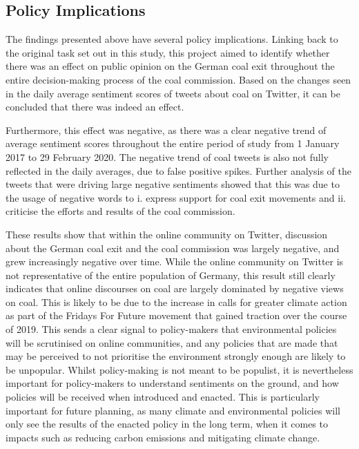\documentclass[12pt,onecolumn,twoside]{layout}
\begin{document}
\subsection*{Policy Implications} 
The findings presented above have several policy implications. Linking back to the original task set out in this study, this project aimed to identify whether there was an effect on public opinion on the German coal exit throughout the entire decision-making process of the coal commission. Based on the changes seen in the daily average sentiment scores of tweets about coal on Twitter, it can be concluded that there was indeed an effect. 

Furthermore, this effect was negative, as there was a clear negative trend of average sentiment scores throughout the entire period of study from 1 January 2017 to 29 February 2020. The negative trend of coal tweets is also not fully reflected in the daily averages, due to false positive spikes. Further analysis of the tweets that were driving large negative sentiments showed that this was due to the usage of negative words to i. express support for coal exit movements and ii. criticise the efforts and results of the coal commission. 

These results show that within the online community on Twitter, discussion about the German coal exit and the coal commission was largely negative, and grew increasingly negative over time. While the online community on Twitter is not representative of the entire population of Germany, this result still clearly indicates that online discourses on coal are largely dominated by negative views on coal. This is likely to be due to the increase in calls for greater climate action as part of the Fridays For Future movement that gained traction over the course of 2019. This sends a clear signal to policy-makers that environmental policies will be scrutinised on online communities, and any policies that are made that may be perceived to not prioritise the environment strongly enough are likely to be unpopular. Whilst policy-making is not meant to be populist, it is nevertheless important for policy-makers to understand sentiments on the ground, and how policies will be received when introduced and enacted. This is particularly important for future planning, as many climate and environmental policies will only see the results of the enacted policy in the long term, when it comes to impacts such as reducing carbon emissions and mitigating climate change.  
\end{document}
